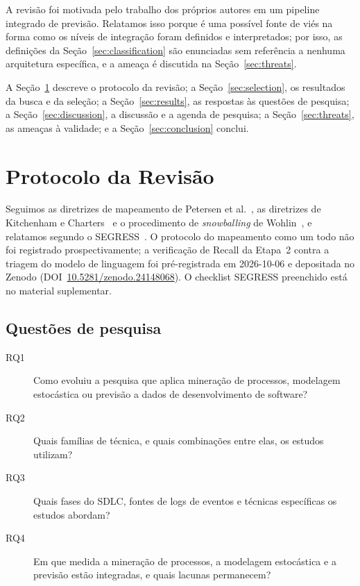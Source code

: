 \documentclass[preprint,12pt,authoryear=false]{elsarticle}
\begin{document}
A revisão foi motivada pelo trabalho dos próprios autores em um pipeline integrado de previsão. Relatamos isso porque é uma possível fonte de viés na forma como os níveis de integração foram definidos e interpretados; por isso, as definições da Seção~\ref{sec:classification} são enunciadas sem referência a nenhuma arquitetura específica, e a ameaça é discutida na Seção~\ref{sec:threats}.

A Seção~\ref{sec:method} descreve o protocolo da revisão; a Seção~\ref{sec:selection}, os resultados da busca e da seleção; a Seção~\ref{sec:results}, as respostas às questões de pesquisa; a Seção~\ref{sec:discussion}, a discussão e a agenda de pesquisa; a Seção~\ref{sec:threats}, as ameaças à validade; e a Seção~\ref{sec:conclusion} conclui.

\section{Protocolo da Revisão}\label{sec:method}

Seguimos as diretrizes de mapeamento de Petersen et al.~\cite{petersen2015}, as diretrizes de Kitchenham e Charters~\cite{kitchenham2007} e o procedimento de \emph{snowballing} de Wohlin~\cite{wohlin2014}, e relatamos segundo o SEGRESS~\cite{segress}. O protocolo do mapeamento como um todo não foi registrado prospectivamente; a verificação de Recall da Etapa~2 contra a triagem do modelo de linguagem foi pré-registrada em 2026-10-06 e depositada no Zenodo (DOI~\href{https://doi.org/10.5281/zenodo.24148068}{10.5281/zenodo.24148068}). O checklist SEGRESS preenchido está no material suplementar.

\subsection{Questões de pesquisa}\label{sec:rqs}

\begin{description}
\item[RQ1] Como evoluiu a pesquisa que aplica mineração de processos, modelagem estocástica ou previsão a dados de desenvolvimento de software?
\item[RQ2] Quais famílias de técnica, e quais combinações entre elas, os estudos utilizam?
\item[RQ3] Quais fases do SDLC, fontes de logs de eventos e técnicas específicas os estudos abordam?
\item[RQ4] Em que medida a mineração de processos, a modelagem estocástica e a previsão estão integradas, e quais lacunas permanecem?
\end{description}
\end{document}
